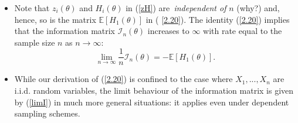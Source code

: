 \documentclass[notes=show]{beamer}
\begin{document}
\begin{frame}%


\begin{itemize}
\item Note that $z_{i}\left( \theta \right) $ and $H_{i}\left( \theta
\right) $ in (\ref{zH}) are\textit{\ independent of} $n$ (why?) and, hence,
so is the matrix $\mathbb{E}\left[ H_{1}\left( \theta \right) \right] $ in (%
\ref{2.20}). The identity (\ref{2.20}) implies that the information matrix $%
\mathcal{I}_{n}\left( \theta \right) $ increases to $\infty $ with rate
equal to the sample size $n$ as $n\rightarrow \infty $:%
\begin{equation}
\lim_{n\rightarrow \infty }\frac{1}{n}\mathcal{I}_{n}\left( \theta \right) =-%
\mathbb{E}\left[ H_{1}\left( \theta \right) \right] .  \label{limI}
\end{equation}

\item While our derivation of (\ref{2.20}) is confined to the case where $%
X_{1},...,X_{n}$ are i.i.d. random variables, the limit behaviour of the
information matrix is given by (\ref{limI}) in much more general situations:
it applies even under dependent sampling schemes.
\end{itemize}

\end{frame}%
\end{document}

